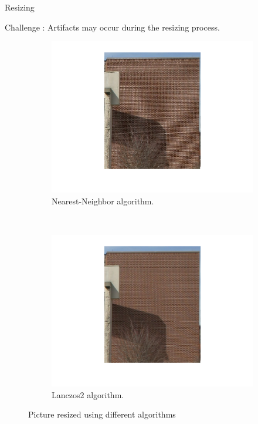\begin{frame}{Resizing}
 
Challenge : Artifacts may occur during the resizing process. 

\begin{figure}
\centering
\begin{subfigure}{0.4\textwidth}
\includegraphics[width= \textwidth]{../Images/bricksCompressed.png}
\vspace{-20pt}
\caption{Nearest-Neighbor algorithm. }
\label{fig:bricksCompressed}
\end{subfigure}
~
\begin{subfigure}{0.4\textwidth}
\includegraphics[width = \textwidth]{../Images/bricksLanczos.png}
\vspace{-20pt}
\caption{Lanczos2 algorithm.}
\label{fig:bricksLanczos}
\end{subfigure}
\caption{Picture resized using different algorithms}
\end{figure}

\end{frame}
